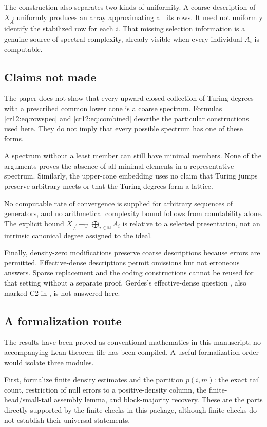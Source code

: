 \documentclass[11pt,letterpaper]{article}
\theoremstyle{plain}
\theoremstyle{definition}
\theoremstyle{remark}
\numberwithin{equation}{section}
\newcommand{\N}{\mathbb N}
\newcommand{\eqT}{\equiv_{\mathrm T}}
\newcommand{\joinvec}{\bigoplus_{i\in\N}}
\begin{document}
The construction also separates two kinds of uniformity. A coarse description
of $X_{\vec A}$ uniformly produces an array approximating all its rows. It
need not uniformly identify the stabilized row for each $i$. That missing
selection information is a genuine source of spectral complexity, already
visible when every individual $A_i$ is computable.

\subsection{Claims not made}
The paper does not show that every upward-closed collection of Turing degrees
with a prescribed common lower cone is a coarse spectrum. Formulas
\eqref{cr12:eq:rowspec} and \eqref{cr12:eq:combined} describe the particular constructions
used here. They do not imply that every possible spectrum has one of these forms.

A spectrum without a least member can still have minimal members. None of the
arguments proves the absence of all minimal elements in a representative
spectrum. Similarly, the upper-cone embedding uses no claim that Turing jumps
preserve arbitrary meets or that the Turing degrees form a lattice.

No computable rate of convergence is supplied for arbitrary sequences of
generators, and no arithmetical complexity bound follows from countability
alone. The explicit bound $X_{\vec A}\eqT\joinvec A_i$ is relative to a selected
presentation, not an intrinsic canonical degree assigned to the ideal.

Finally, density-zero modifications preserve coarse descriptions because errors
are permitted. Effective-dense descriptions permit omissions but not erroneous
answers. Sparse replacement and the coding constructions cannot be reused for
that setting without a separate proof. Gerdes's effective-dense question
\cite[Question~7]{Gerdes}, also marked C2 in \cite{Repo}, is not answered here.

\subsection{A formalization route}
The results have been proved as conventional mathematics in this manuscript;
no accompanying Lean theorem file has been compiled. A useful formalization
order would isolate three modules.

First, formalize finite density estimates and the partition $p(i,m)$:
the exact tail count, restriction of null errors to a positive-density column,
the finite-head/small-tail assembly lemma, and block-majority recovery. These
are the parts directly supported by the finite checks in this package, although
finite checks do not establish their universal statements.
\end{document}
